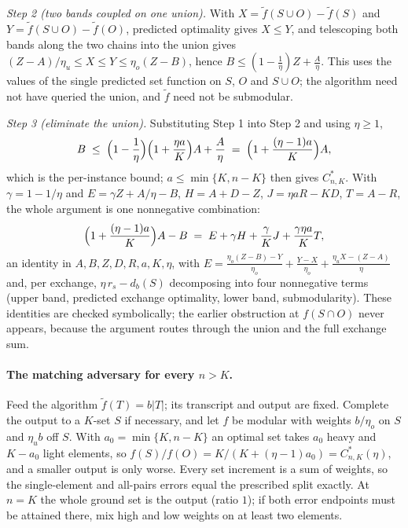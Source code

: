\emph{Step 2 (two bands coupled on one union).}  With
$X=\tilde f(S\cup O)-\tilde f(S)$ and $Y=\tilde f(S\cup O)-\tilde f(O)$,
predicted optimality gives $X\le Y$, and telescoping both bands along the
two chains into the union gives $(Z-A)/\eta_u\le X\le Y\le\eta_o(Z-B)$,
hence $B\le(1-\tfrac1\eta)Z+\tfrac A\eta$.  This uses the values of the
single predicted set function on $S$, $O$ and $S\cup O$; the algorithm
need not have queried the union, and $\tilde f$ need not be submodular.

\emph{Step 3 (eliminate the union).}  Substituting Step 1 into Step 2 and
using $\eta\ge1$,
\[
  B\;\le\;\Bigl(1-\frac1\eta\Bigr)\Bigl(1+\frac{\eta a}{K}\Bigr)A
  +\frac A\eta
  \;=\;\Bigl(1+\frac{(\eta-1)a}{K}\Bigr)A ,
\]
which is the per-instance bound; $a\le\min\{K,n-K\}$ then gives
$C^{*}_{n,K}$.  With $\gamma=1-1/\eta$ and
$E=\gamma Z+A/\eta-B$, $H=A+D-Z$, $J=\eta aR-KD$, $T=A-R$, the whole
argument is one nonnegative combination:
\begin{equation}\label{eq:ceiling-slack}
  \Bigl(1+\frac{(\eta-1)a}{K}\Bigr)A-B
  \;=\;E+\gamma H+\frac{\gamma}{K}J+\frac{\gamma\eta a}{K}T ,
\end{equation}
an identity in $A,B,Z,D,R,a,K,\eta$, with
$E=\frac{\eta_o(Z-B)-Y}{\eta_o}+\frac{Y-X}{\eta_o}
+\frac{\eta_uX-(Z-A)}{\eta}$ and, per exchange,
$\eta\,r_s-d_b(S)$ decomposing into four nonnegative terms (upper band,
predicted exchange optimality, lower band, submodularity).  These
identities are checked symbolically; the earlier obstruction at
$f(S\cap O)$ never appears, because the argument routes through the union
and the full exchange sum.

\paragraph{The matching adversary for every $n>K$.}
Feed the algorithm $\tilde f(T)=b|T|$; its transcript and output are
fixed.  Complete the output to a $K$-set $S$ if necessary, and let $f$ be
modular with weights $b/\eta_o$ on $S$ and $\eta_ub$ off $S$.  With
$a_0=\min\{K,n-K\}$ an optimal set takes $a_0$ heavy and $K-a_0$ light
elements, so $f(S)/f(O)=K/(K+(\eta-1)a_0)=C^{*}_{n,K}(\eta)$, and a
smaller output is only worse.  Every set increment is a sum of weights, so
the single-element and all-pairs errors equal the prescribed split
exactly.  At $n=K$ the whole ground set is the output (ratio $1$); if both
error endpoints must be attained there, mix high and low weights on at
least two elements.

